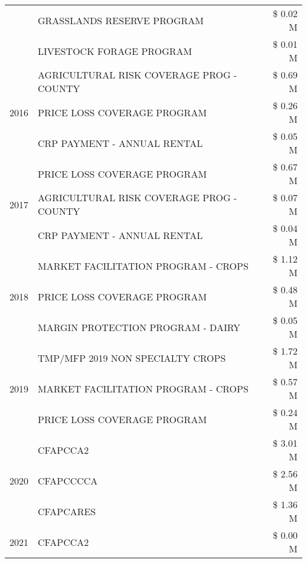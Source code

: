 \begin{tabular}{llr}
 & GRASSLANDS RESERVE PROGRAM & \$ 0.02 M \\
 & LIVESTOCK FORAGE PROGRAM & \$ 0.01 M \\
\cline{1-3}
\multirow[t]{3}{*}{2016} & AGRICULTURAL RISK COVERAGE PROG - COUNTY & \$ 0.69 M \\
 & PRICE LOSS COVERAGE PROGRAM & \$ 0.26 M \\
 & CRP PAYMENT - ANNUAL RENTAL & \$ 0.05 M \\
\cline{1-3}
\multirow[t]{3}{*}{2017} & PRICE LOSS COVERAGE PROGRAM & \$ 0.67 M \\
 & AGRICULTURAL RISK COVERAGE PROG - COUNTY & \$ 0.07 M \\
 & CRP PAYMENT - ANNUAL RENTAL & \$ 0.04 M \\
\cline{1-3}
\multirow[t]{3}{*}{2018} & MARKET FACILITATION PROGRAM - CROPS & \$ 1.12 M \\
 & PRICE LOSS COVERAGE PROGRAM & \$ 0.48 M \\
 & MARGIN PROTECTION PROGRAM - DAIRY & \$ 0.05 M \\
\cline{1-3}
\multirow[t]{3}{*}{2019} & TMP/MFP 2019 NON SPECIALTY CROPS & \$ 1.72 M \\
 & MARKET FACILITATION PROGRAM - CROPS & \$ 0.57 M \\
 & PRICE LOSS COVERAGE PROGRAM & \$ 0.24 M \\
\cline{1-3}
\multirow[t]{3}{*}{2020} & CFAPCCA2 & \$ 3.01 M \\
 & CFAPCCCCA & \$ 2.56 M \\
 & CFAPCARES & \$ 1.36 M \\
\cline{1-3}
2021 & CFAPCCA2 & \$ 0.00 M \\
\cline{1-3}
\bottomrule
\end{tabular}
